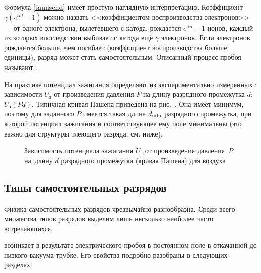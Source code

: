 Формула \eqref{taunsend} имеет простую наглядную интерпретацию. 
Коэффициент $\gamma (e^{\alpha d}-1)$ можно назвать
<<коэффициентом воспроизводства электронов>> --- от одного электрона,
вылетевшего с катода, рождается $e^{\alpha d}-1$ ионов,
каждый из которых впоследствии выбивает с катода ещё $\gamma$ электронов.
Если электронов рождается больше, чем погибает (коэффициент воспроизводства больше единицы), 
разряд может стать самостоятельным.
Описанный процесс пробоя называют . 

На практике потенциал зажигания определяют из экспериментально измеренных
: зависимости $U_{з}$ от произведения
давления $P$ на длину разрядного промежутка $d$: $U_{з}(Pd)$.
Типичная кривая Пашена приведена на рис.~.
Она имеет минимум, поэтому для заданного $P$ имеется такая длина
$d_{\rm min}$ разрядного промежутка,
при которой потенциал зажигания и соответствующее ему поле минимальны
(это важно для структуры тлеющего разряда, см. ниже).

\begin{figure}[h!]
	\centering
\footnotesize	{}
	\caption{Зависимость потенциала зажигания $U_\text{з}$ от произведения
давления~$P$ на~длину $d$ разрядного промежутка (кривая Пашена) для воздуха}
\end{figure}





\subsection*{Типы самостоятельных разрядов}

Физика самостоятельных разрядов чрезвычайно разнообразна. Среди всего
множества типов разрядов выделим лишь несколько наиболее часто встречающихся.

 возникает в результате электрического пробоя в
постоянном поле в откачанной до низкого вакуума трубке. Его свойства
подробно разобраны в следующих разделах.

